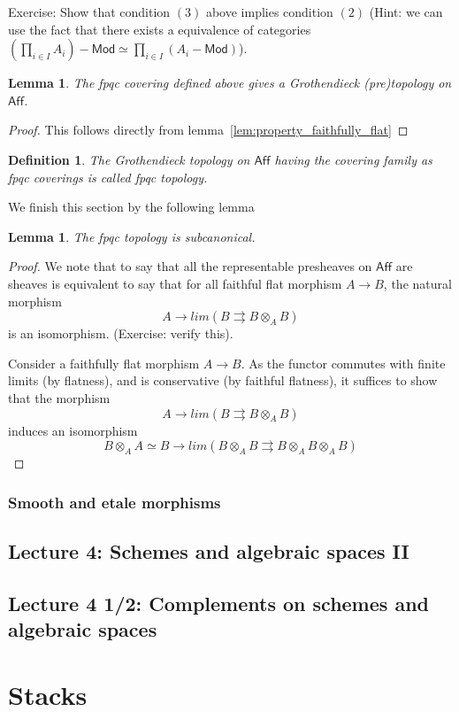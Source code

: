 \documentclass{tufte-book} %
\numberwithin{dummy}{section}
\newtheorem{lemma}[thm]{Lemma}
\newtheorem{dfn}[thm]{Definition}
\newcommand{\lrta}{\longrightarrow}
\begin{document}
Exercise: Show that condition $(3)$ above implies condition $(2)$ (Hint: we can use the fact that there exists a equivalence of categories $(\prod_{i\in I} A_i)-\mathsf{Mod}\simeq \prod_{i\in I}(A_i-\mathsf{Mod})$).

\begin{lemma}
The fpqc covering defined above gives a Grothendieck (pre)topology on $\mathsf{Aff}$.
\end{lemma}
\begin{proof}
This follows directly from lemma~\ref{lem:property_faithfully_flat}
\end{proof}
\begin{dfn}
The Grothendieck topology on $\mathsf{Aff}$ having the covering family as fpqc coverings is called fpqc topology.
\end{dfn}
We finish this section by the following lemma
\begin{lemma}
The fpqc topology is subcanonical.
\end{lemma}
\begin{proof}
We note that to say that all the representable presheaves on $\mathsf{Aff}$ are sheaves is equivalent to say that for all faithful flat morphism $A\lrta B$, the natural morphism
$$
A\lrta lim(B\rightrightarrows B\otimes_A B)
$$
is an isomorphism. (Exercise: verify this).

Consider a faithfully flat morphism $A\lrta B$. As the functor commutes with finite limits (by flatness), and is conservative (by faithful flatness), it suffices to show that the morphism
$$
A\lrta lim(B\rightrightarrows B\otimes_A B)
$$
induces an isomorphism
$$
B\otimes_A A\simeq B\lrta lim(B\otimes_A B\rightrightarrows B\otimes_A B\otimes_A B)
$$
\end{proof}
\subsection{Smooth and etale morphisms}
\section{Lecture 4: Schemes and algebraic spaces II}
\section{Lecture 4 1/2: Complements on schemes and algebraic spaces}
\chapter{Stacks}
\end{document}
